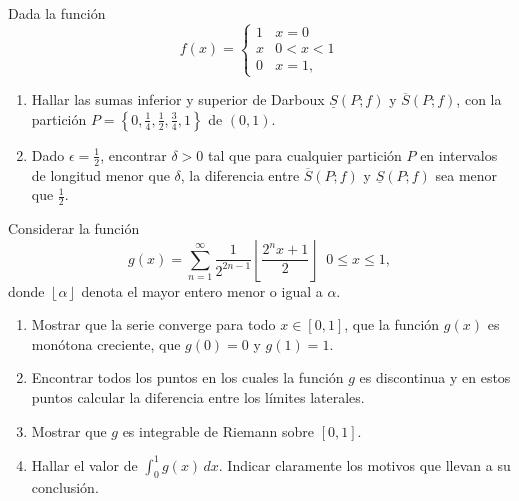 \documentclass{book}
\begin{document}
\begin{ejer}{} Dada la función  
\[ 
f(x)=\left
\{\begin{array}{ll}
1&x=0\\
x&0<x<1\\
0&x=1,
\end{array}
\right.\]
\begin{enumerate}
    \item Hallar las sumas inferior y superior de Darboux $\underline{S}(P;f)$ y $\overline{S}(P;f)$, 
    con la partición $P=\left\{0,\frac{1}{4},\frac{1}{2},\frac{3}{4},1\right\}$ de $(0,1)$. \item Dado $\epsilon=\frac{1}{2}$, 
encontrar $\delta>0$ tal que para cualquier partición $P$ en intervalos de longitud menor que $\delta$, 
la diferencia entre $\overline{S}(P;f)$ y $\underline{S}(P;f)$ sea menor que $\frac{1}{2}$.
\end{enumerate}
\end{ejer}  



\begin{ejer}{} Considerar la función 
\[
g(x)=\sum_{n=1}^{\infty} \frac{1}{2^{2n-1}}\left\lfloor \frac{2^nx+1}{2}\right\rfloor\;\;0\leq x\leq 1,
\]
donde $\left\lfloor\alpha\right\rfloor$ denota el mayor entero menor o igual a $\alpha$.
\\
\begin{enumerate}\item 
Mostrar que la serie converge para todo $x \in [0,1]$, que la función $g(x)$ es monótona creciente, que 
$g(0)=0$ y $g(1)=1$.

\item
Encontrar todos los puntos en los cuales la función $g$ es discontinua y en estos puntos calcular la diferencia
entre los límites laterales.



\item Mostrar que $g$ es integrable de Riemann sobre $[0,1]$.
\item 
Hallar el valor de $\int_0^1 g(x)\,dx.$ %
Indicar claramente los motivos que llevan a su conclusión.
\end{enumerate}

\end{ejer}  
\end{document}

